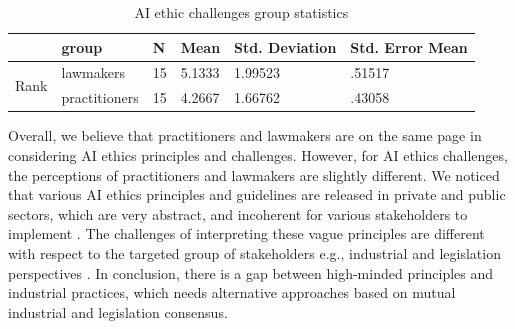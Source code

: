 \begin{table}[]
\centering
\caption{AI ethic challenges group statistics}
\label{tab:group-stat-challenges}
\begin{tabular}{|l|l|l|l|l|l|}
\hline
 & group & N & Mean & Std. Deviation & Std. Error Mean \\ \hline
\multirow{2}{*}{Rank} & lawmakers & 15 & 5.1333 & 1.99523 & .51517 \\ \cline{2-6} 
 & practitioners & 15 & 4.2667 & 1.66762 & .43058 \\ \hline
\end{tabular}%
\end{table}
Overall, we believe that practitioners and lawmakers are on the same page in considering AI ethics principles and challenges. 
However, for AI ethics challenges, the perceptions of practitioners and lawmakers are slightly different. 
We noticed that various AI ethics principles and guidelines are released in private and public sectors, which are very abstract, and incoherent for various stakeholders to implement \cite{munn2022uselessness}. The challenges of interpreting these vague principles are different with respect to the targeted group of stakeholders e.g., industrial and legislation perspectives \cite{munn2022uselessness}. In conclusion, there is a gap between high-minded principles and industrial practices, which needs alternative approaches based on mutual industrial and legislation consensus.

